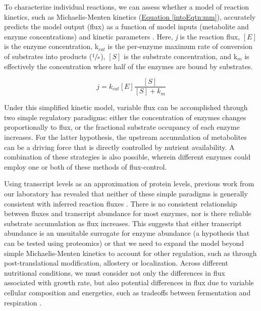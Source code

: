 To characterize individual reactions, we can assess whether a model of reaction kinetics, such as Michaelis-Menten kinetics (\hyperref[intoEqtn:mm]{Equation \ref{intoEqtn:mm}}), accurately predicts the model output (flux) as a function of model inputs (metabolite and enzyme concentrations) and kinetic parameters \cite{Anonymous:1913wn, Liebermeister:2006fm, Tummler:2014cp}. Here, \textit{j} is the reaction flux, $\left[E\right]$ is the enzyme concentration, k$_{cat}$ is the per-enzyme maximum rate of conversion of substrates into products ($\sfrac{1}{s}$), $\left[S\right]$ is the substrate concentration, and k$_{m}$ is effectively the concentration where half of the enzymes are bound by substrates.

\begin{equation}
j = k_{cat}\left[E\right]\frac{\left[S\right]}{\left[S\right] + k_{m}}\label{intoEqtn:mm}
\end{equation}

Under this simplified kinetic model, variable flux can be accomplished through two simple regulatory paradigms: either the concentration of enzymes changes proportionally to flux, or the fractional substrate occupancy of each enzyme increases. For the latter hypothesis, the upstream accumulation of metabolites can be a driving force that is directly controlled by nutrient availability. A combination of these strategies is also possible, wherein different enzymes could employ one or both of these methods of flux-control. 

Using transcript levels as an approximation of protein levels, previous work from our laboratory has revealed that neither of these simple paradigms is generally consistent with inferred reaction fluxes \cite{Bradley:2009fj}. There is no consistent relationship between fluxes and transcript abundance for most enzymes, nor is there reliable substrate accumulation as flux increases. This suggests that either transcript abundance is an unsuitable surrogate for enzyme abundance (a hypothesis that can be tested using proteomics) or that we need to expand the model beyond simple Michaelis-Menten kinetics to account for other regulation, such as through post-translational modification, allostery or localization. Across different nutritional conditions, we must consider not only the differences in flux associated with growth rate, but also potential differences in flux due to variable cellular composition and energetics, such as tradeoffs between fermentation and respiration \cite{Lange:2001th, Feist:2010hq, BARFORD:1979ei}.

